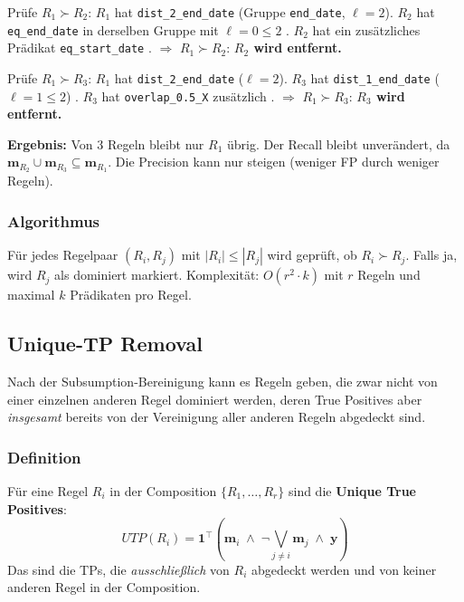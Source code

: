 \documentclass[11pt,a4paper]{article}
\begin{document}
\noindent Pr\"ufe $R_1 \succ R_2$: $R_1$ hat \texttt{dist\_2\_end\_date} (Gruppe \texttt{end\_date}, $\ell = 2$). $R_2$ hat \texttt{eq\_end\_date} in derselben Gruppe mit $\ell = 0 \leq 2$ \checkmark. $R_2$ hat ein zus\"atzliches Pr\"adikat \texttt{eq\_start\_date} \checkmark. $\Rightarrow$ $R_1 \succ R_2$: \textbf{$R_2$ wird entfernt.}

\medskip
\noindent Pr\"ufe $R_1 \succ R_3$: $R_1$ hat \texttt{dist\_2\_end\_date} ($\ell = 2$). $R_3$ hat \texttt{dist\_1\_end\_date} ($\ell = 1 \leq 2$) \checkmark. $R_3$ hat \texttt{overlap\_0.5\_X} zus\"atzlich \checkmark. $\Rightarrow$ $R_1 \succ R_3$: \textbf{$R_3$ wird entfernt.}

\medskip
\noindent\textbf{Ergebnis:} Von 3 Regeln bleibt nur $R_1$ \"ubrig. Der Recall bleibt unver\"andert, da $\mathbf{m}_{R_2} \cup \mathbf{m}_{R_3} \subseteq \mathbf{m}_{R_1}$. Die Precision kann nur steigen (weniger FP durch weniger Regeln).

\subsubsection{Algorithmus}

F\"ur jedes Regelpaar $(R_i, R_j)$ mit $|R_i| \leq |R_j|$ wird gepr\"uft, ob $R_i \succ R_j$. Falls ja, wird $R_j$ als dominiert markiert. Komplexit\"at: $O(r^2 \cdot k)$ mit $r$ Regeln und maximal $k$ Pr\"adikaten pro Regel.

\subsection{Unique-TP Removal}

Nach der Subsumption-Bereinigung kann es Regeln geben, die zwar nicht von einer einzelnen anderen Regel dominiert werden, deren True Positives aber \emph{insgesamt} bereits von der Vereinigung aller anderen Regeln abgedeckt sind.

\subsubsection{Definition}

F\"ur eine Regel $R_i$ in der Composition $\{R_1, \dots, R_r\}$ sind die \textbf{Unique True Positives}:
\[
  \mathit{UTP}(R_i) = \mathbf{1}^\top\!\left(\mathbf{m}_i \;\wedge\; \neg\!\bigvee_{j \neq i} \mathbf{m}_j \;\wedge\; \mathbf{y}\right)
\]
Das sind die TPs, die \emph{ausschlie\ss lich} von $R_i$ abgedeckt werden und von keiner anderen Regel in der Composition.
\end{document}
